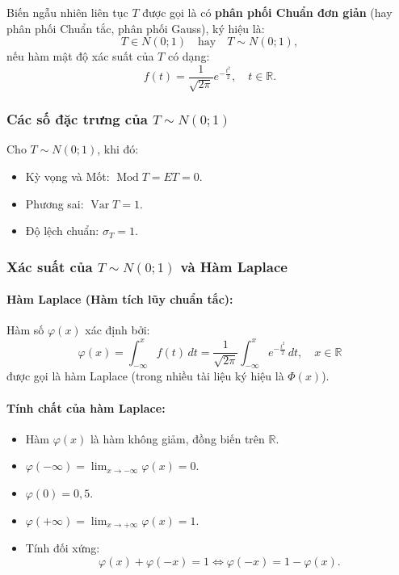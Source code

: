 \begin{dinhnghia}
Biến ngẫu nhiên liên tục $T$ được gọi là có \textbf{phân phối Chuẩn đơn giản} (hay phân phối Chuẩn tắc, phân phối Gauss), ký hiệu là:
\[
T \in N(0; 1) \quad \text{hay} \quad T \sim N(0; 1),
\]
nếu hàm mật độ xác suất của $T$ có dạng:
\[
f(t) = \frac{1}{\sqrt{2\pi}} e^{-\frac{t^2}{2}}, \quad t \in \mathbb{R}.
\]
\end{dinhnghia}

\subsubsection{Các số đặc trưng của \texorpdfstring{$T \sim N(0; 1)$}{T ~ N(0; 1)}}

\begin{tinhchat}
Cho $T \sim N(0; 1)$, khi đó:
\begin{itemize}
    \item Kỳ vọng và Mốt: $\operatorname{Mod} T = ET = 0$.
    \item Phương sai: $\operatorname{Var} T = 1$.
    \item Độ lệch chuẩn: $\sigma_T = 1$.
\end{itemize}
\end{tinhchat}

\subsubsection{Xác suất của \texorpdfstring{$T \sim N(0; 1)$}{T ~ N(0; 1)} và Hàm Laplace}

\paragraph{Hàm Laplace (Hàm tích lũy chuẩn tắc):}
Hàm số $\varphi(x)$ xác định bởi:
\[
\varphi(x) = \int_{-\infty}^x f(t)\,dt = \frac{1}{\sqrt{2\pi}} \int_{-\infty}^x e^{-\frac{t^2}{2}}\,dt, \quad x \in \mathbb{R}
\]
được gọi là hàm Laplace (trong nhiều tài liệu ký hiệu là $\Phi(x)$).

\paragraph{Tính chất của hàm Laplace:}
\begin{itemize}
    \item Hàm $\varphi(x)$ là hàm không giảm, đồng biến trên $\mathbb{R}$.
    \item $\varphi(-\infty) = \lim_{x \to -\infty} \varphi(x) = 0$.
    \item $\varphi(0) = 0{,}5$.
    \item $\varphi(+\infty) = \lim_{x \to +\infty} \varphi(x) = 1$.
    \item Tính đối xứng:
    \[
    \varphi(x) + \varphi(-x) = 1 \iff \varphi(-x) = 1 - \varphi(x).
    \]
\end{itemize}


